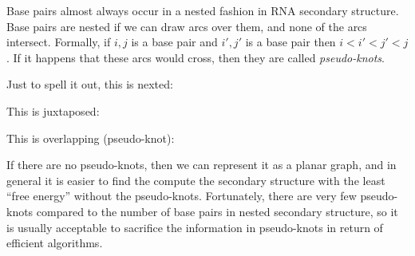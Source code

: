     Base pairs almost always occur in a nested fashion in RNA secondary 
    structure. Base pairs are nested if we can draw arcs over them, and none of 
    the arcs intersect. Formally, if $i,j$ is a base pair and $i',j'$ is a base 
    pair then $i<i'<j'<j$. If it happens that these arcs would cross, then they 
    are called \textit{pseudo-knots}.
    
    Just to spell it out, this is nexted:
    
    
    This is juxtaposed:
    
    
    This is overlapping (pseudo-knot):
    
    
    If there are no pseudo-knots, then we can represent it as a planar graph, 
    and in general it is easier to find the compute the secondary structure 
    with the least ``free energy'' without the pseudo-knots. Fortunately, there 
    are very few pseudo-knots compared to the number of base pairs in nested 
    secondary structure, so it is usually acceptable to sacrifice the 
    information in pseudo-knots in return of efficient algorithms.
    
